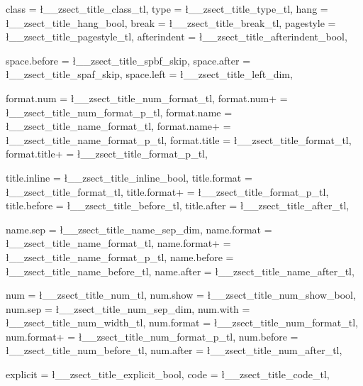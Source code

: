   {
    class           = \l__zsect_title_class_tl,
    type            = \l__zsect_title_type_tl,
    hang            = \l__zsect_title_hang_bool,     %
    break           = \l__zsect_title_break_tl,      %
    pagestyle       = \l__zsect_title_pagestyle_tl,
    afterindent     = \l__zsect_title_afterindent_bool,

    space.before    = \l__zsect_title_spbf_skip,
    space.after     = \l__zsect_title_spaf_skip,
    space.left      = \l__zsect_title_left_dim,

    format.num      = \l__zsect_title_num_format_tl, 
    format.num+     = \l__zsect_title_num_format_p_tl, 
    format.name     = \l__zsect_title_name_format_tl, 
    format.name+    = \l__zsect_title_name_format_p_tl, 
    format.title    = \l__zsect_title_format_tl, 
    format.title+   = \l__zsect_title_format_p_tl, 

    title.inline    = \l__zsect_title_inline_bool,
    title.format    = \l__zsect_title_format_tl,
    title.format+   = \l__zsect_title_format_p_tl,
    title.before    = \l__zsect_title_before_tl,
    title.after     = \l__zsect_title_after_tl,

    name.sep        = \l__zsect_title_name_sep_dim,
    name.format     = \l__zsect_title_name_format_tl,
    name.format+    = \l__zsect_title_name_format_p_tl,
    name.before     = \l__zsect_title_name_before_tl,
    name.after      = \l__zsect_title_name_after_tl,

    num             = \l__zsect_title_num_tl,
    num.show        = \l__zsect_title_num_show_bool,
    num.sep         = \l__zsect_title_num_sep_dim,
    num.with        = \l__zsect_title_num_width_tl,  %
    num.format      = \l__zsect_title_num_format_tl,
    num.format+     = \l__zsect_title_num_format_p_tl,
    num.before      = \l__zsect_title_num_before_tl,
    num.after       = \l__zsect_title_num_after_tl,

    explicit        = \l__zsect_title_explicit_bool,
    code            = \l__zsect_title_code_tl,

}
